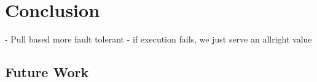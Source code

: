 \chapter{Conclusion}
\label{chapter:conclusion}

- Pull based more fault tolerant - if execution fails, we just serve an allright value

\section{Future Work}
\label{sec:future_work}





